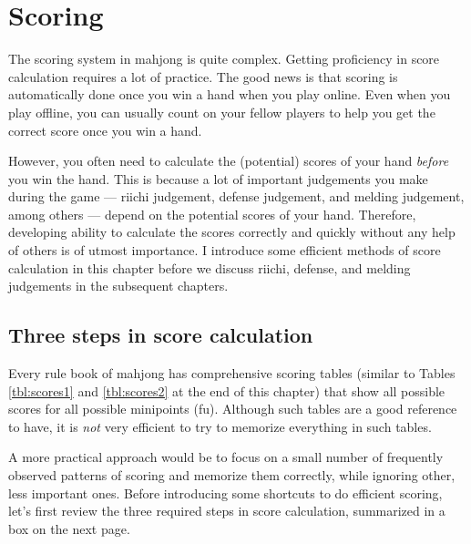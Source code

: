 
\chapter{Scoring}\label{ch:scores}
\thispagestyle{fancy}

The scoring system in mahjong is quite complex. Getting proficiency in score calculation requires a lot of practice. The good news is that scoring is automatically done once you win a hand when you play online. Even when you play offline, you can usually count on your fellow players to help you get the correct score once you win a hand. 

\bigskip
However, you often need to calculate the (potential) scores of your hand \emph{before} you win the hand. This is because a lot of important judgements you make during the game --- {\jap riichi} judgement, defense judgement, and melding judgement, among others --- depend on the potential scores of your hand. Therefore, developing ability to calculate the scores correctly and quickly without any help of others is of utmost importance. I introduce some efficient methods of score calculation in this chapter before we discuss {\jap riichi}, defense, and melding judgements in the subsequent chapters. 

\section{Three steps in score calculation}

Every rule book of mahjong has comprehensive scoring tables (similar to Tables \ref{tbl:scores1} and \ref{tbl:scores2} at the end of this chapter) that show all possible scores for all possible minipoints ({\jap fu}). Although such tables are a good reference to have, it is \emph{not} very efficient to try to memorize everything in such tables. 

\bigskip
A more practical approach would be to focus on a small number of frequently observed patterns of scoring and memorize them correctly, while ignoring other, less important ones. Before introducing some shortcuts to do efficient scoring, let's first review the three required steps in score calculation, summarized in a box on the next page.
\newpage

